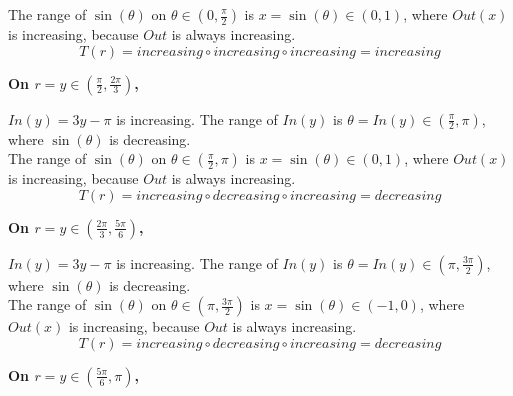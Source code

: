 \documentclass{ximera}
\begin{document}
The range of $\sin(\theta)$ on $\theta \in \left(0, \frac{\pi}{2} \right)$ is $x = \sin(\theta) \in (0, 1)$, where $Out(x)$ is increasing, because $Out$ is always increasing. \\


\[
T(r) = increasing \circ increasing \circ increasing = increasing
\]








\textbf{\textcolor{purple!80!black}{On $r = y \in \left( \frac{\pi}{2}, \frac{2\pi}{3} \right)$, }}




$In(y) = 3y - \pi$ is increasing.  The range of $In(y)$ is $\theta = In(y) \in \left(\frac{\pi}{2}, \pi \right)$, where $\sin(\theta)$ is decreasing. \\



The range of $\sin(\theta)$ on $\theta \in \left( \frac{\pi}{2}, \pi \right)$ is $x = \sin(\theta) \in (0, 1)$, where $Out(x)$ is increasing, because $Out$ is always increasing. \\


\[
T(r) = increasing \circ decreasing \circ increasing = decreasing
\]












\textbf{\textcolor{purple!80!black}{On $r = y \in \left( \frac{2\pi}{3}, \frac{5\pi}{6} \right)$, }}




$In(y) = 3y - \pi$ is increasing.  The range of $In(y)$ is $\theta = In(y) \in \left(\pi, \frac{3\pi}{2} \right)$, where $\sin(\theta)$ is decreasing. \\



The range of $\sin(\theta)$ on $\theta \in \left( \pi, \frac{3\pi}{2} \right)$ is $x = \sin(\theta) \in (-1, 0)$, where $Out(x)$ is increasing, because $Out$ is always increasing. \\


\[
T(r) = increasing \circ decreasing \circ increasing = decreasing
\]










\textbf{\textcolor{purple!80!black}{On $r = y \in \left( \frac{5\pi}{6}, \pi \right)$, }}
\end{document}
